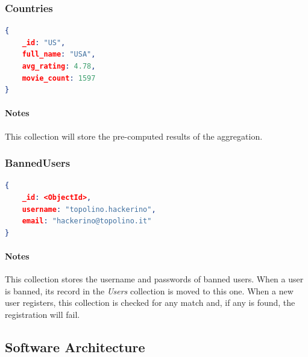 \documentclass[11pt]{article}
\begin{document}
\subsubsection{Countries}
\label{sec:countries}

\begin{lstlisting}[language=json]	
{
	_id: "US",
	full_name: "USA",
	avg_rating: 4.78,
	movie_count: 1597
}
\end{lstlisting}

\paragraph{Notes}
This collection will store the pre-computed results of the aggregation.

\subsubsection{BannedUsers}
\label{sec:banned_users}

\begin{lstlisting}[language=json]	
{
	_id: <ObjectId>,
	username: "topolino.hackerino",
	email: "hackerino@topolino.it"
}
\end{lstlisting}

\paragraph{Notes}
This collection stores the username and passwords of banned users. 
When a user is banned, its record in the \emph{Users} collection is moved
to this one.
When a new user registers, this collection is checked for any match and, 
if any is found, the registration will fail. 

\subsection{Software Architecture}

\end{document}
